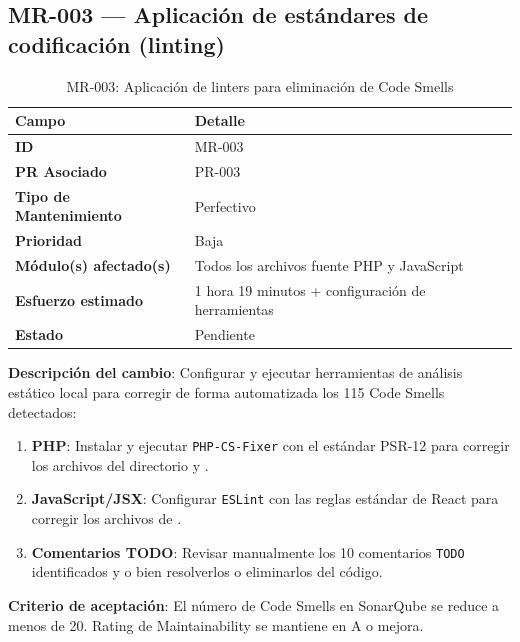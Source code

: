 \documentclass[12pt]{article}
\begin{document}
\newpage

\subsection[MR-003: Linting y estándares de codificación]{MR-003 --- Aplicación de estándares de codificación (linting)}

\begin{table}[H]
\centering
\begin{tabularx}{\textwidth}{lX}
\toprule
\textbf{Campo}               & \textbf{Detalle} \\
\midrule
\textbf{ID}                  & MR-003 \\
\textbf{PR Asociado}         & PR-003 \\
\textbf{Tipo de Mantenimiento}& Perfectivo \\
\textbf{Prioridad}           & Baja \\
\textbf{Módulo(s) afectado(s)}& Todos los archivos fuente PHP y JavaScript \\
\textbf{Esfuerzo estimado}   & 1 hora 19 minutos + configuración de herramientas \\
\textbf{Estado}              & Pendiente \\
\bottomrule
\end{tabularx}
\caption{MR-003: Aplicación de linters para eliminación de Code Smells}
\end{table}

\textbf{Descripción del cambio}: Configurar y ejecutar herramientas de análisis
estático local para corregir de forma automatizada los 115 Code Smells detectados:

\begin{enumerate}
    \item \textbf{PHP}: Instalar y ejecutar \texttt{PHP-CS-Fixer} con el estándar
    PSR-12 para corregir los archivos del directorio  y .
    \item \textbf{JavaScript/JSX}: Configurar \texttt{ESLint} con las reglas
    estándar de React para corregir los archivos de .
    \item \textbf{Comentarios TODO}: Revisar manualmente los 10 comentarios
    \texttt{TODO} identificados y o bien resolverlos o eliminarlos del código.
\end{enumerate}

\textbf{Criterio de aceptación}: El número de Code Smells en SonarQube se reduce
a menos de 20. Rating de Maintainability se mantiene en A o mejora.
\end{document}
